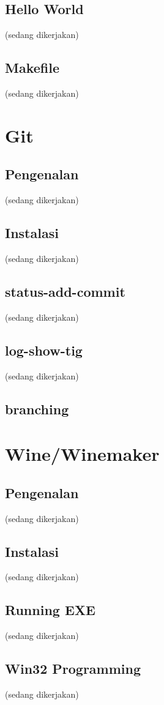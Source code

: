 \documentclass[12pt,]{article}
\begin{document}
	\subsection{Hello World}
	(sedang dikerjakan)
	
	\subsection{Makefile}
	(sedang dikerjakan)
	
	\section{Git}
	
	\subsection{Pengenalan}
	(sedang dikerjakan)
	
	\subsection{Instalasi}
	(sedang dikerjakan)
	
	\subsection{status-add-commit}
	(sedang dikerjakan)
	
	\subsection{log-show-tig}
	(sedang dikerjakan)
	
	\subsection{branching}
	
	\section{Wine/Winemaker}
	
	\subsection{Pengenalan}
	(sedang dikerjakan)
	
	\subsection{Instalasi}
	(sedang dikerjakan)
	
	\subsection{Running EXE}
	(sedang dikerjakan)
	
	\subsection{Win32 Programming}
	(sedang dikerjakan)
	
\end{document}
